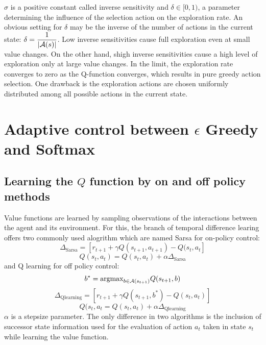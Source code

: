 \documentclass[10.5pt]{article}
\begin{document}
$\sigma$  is a positive constant called inverse sensitivity and $\delta \in [0,1)$, a parameter determining the influence of the selection action on the exploration rate. An obvious setting for $\delta$ may be the inverse of the number of actions in the current state: $\delta = \dfrac{1}{|{\cal A}(s)|}$. Low inverse sensitivities cause full exploration even at small value changes. On the other hand, shigh inverse sensitivities cause a high level of exploration only at large value changes. In the limit, the exploration rate converges to zero as the Q-function converges, which results in pure greedy action selection. One drawback is the exploration actions are chosen uniformly distributed among all possible actions in the current state. 

\section{Adaptive control between $\epsilon$ Greedy and Softmax}
\subsection{Learning the $Q$ function by on and off policy methods}
Value functions are learned by sampling observations of the interactions between the agent and its environment. For this, the branch of temporal difference learing offers two commonly used alogrithm which are named Sarsa for on-policy control:
\begin{equation}
\Delta_{\text{Sarsa}} = [r_{t+1} + \gamma Q(s_{t+1}, a_{t+1}) - Q(s_t,a_t]
\end{equation}
\begin{equation}
Q(s_t,a_t) = Q(s_t, a_t) + \alpha \Delta_\text{Sarsa}
\end{equation}
and Q learning for off policy control: 
\begin{equation}
b^* = {\rm argmax}_{b\in {\cal A}(s_{t+1})}Q(s_{t+1}, b)
\end{equation}
\begin{equation}
\Delta_{\text{Qlearning}} = [r_{t+1}+\gamma Q(s_{t+1}, b^*) - Q(s_t,a_t)]
\end{equation}
\begin{equation}
Q(s_t,a_t = Q(s_t, a_t) + \alpha \Delta_{\text{Qlearning}}
\end{equation}
$\alpha$ is a stepsize parameter. The only difference in two algorithms is the inclusion of successor state information used for the evaluation of action $a_t$ taken in state $s_t$ while learning the value function. 
\end{document}
